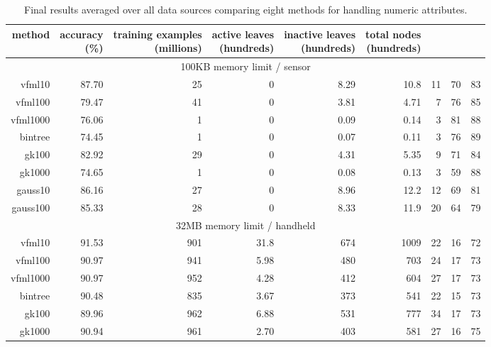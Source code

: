 \begin{table}
\caption{Final results averaged over all data sources comparing eight methods for handling numeric attributes.}
\label{tab:numavgs}
\centering
\begin{tabular}{|r|r|r|r|r|r|r|r|r|}
\hline
method	&
\rotatebox{90}{\parbox{9em}{accuracy\\(\%)}} &
\rotatebox{90}{\parbox{9em}{training examples\\(millions)}} &
\rotatebox{90}{\parbox{9em}{active leaves\\(hundreds)}} &
\rotatebox{90}{\parbox{9em}{inactive leaves\\(hundreds)}} &
\rotatebox{90}{\parbox{9em}{total nodes\\(hundreds)}} &
\rotatebox{90}{\parbox{9em}{tree depth}}	&
\rotatebox{90}{\parbox{9em}{training speed (\%)}} &
\rotatebox{90}{\parbox{9em}{prediction speed (\%)}} \\
\hline
\multicolumn{9}{|c|}{100KB memory limit / sensor} \\
\hline
{\sc vfml10} & 87.70 & 25 & 0 & 8.29 & 10.8 & 11 & 70 & 83 \\
{\sc vfml100} & 79.47 & 41 & 0 & 3.81 & 4.71 & 7 & 76 & 85 \\
{\sc vfml1000} & 76.06 & 1 & 0 & 0.09 & 0.14 & 3 & 81 & 88 \\
{\sc bintree} & 74.45 & 1 & 0 & 0.07 & 0.11 & 3 & 76 & 89 \\
{\sc gk100} & 82.92 & 29 & 0 & 4.31 & 5.35 & 9 & 71 & 84 \\
{\sc gk1000} & 74.65 & 1 & 0 & 0.08 & 0.13 & 3 & 59 & 88 \\
{\sc gauss10} & 86.16 & 27 & 0 & 8.96 & 12.2 & 12 & 69 & 81 \\
{\sc gauss100} & 85.33 & 28 & 0 & 8.33 & 11.9 & 20 & 64 & 79 \\
\hline
\multicolumn{9}{|c|}{32MB memory limit / handheld} \\
\hline
{\sc vfml10} & 91.53 & 901 & 31.8 & 674 & 1009 & 22 & 16 & 72 \\
{\sc vfml100} & 90.97 & 941 & 5.98 & 480 & 703 & 24 & 17 & 73 \\
{\sc vfml1000} & 90.97 & 952 & 4.28 & 412 & 604 & 27 & 17 & 73 \\
{\sc bintree} & 90.48 & 835 & 3.67 & 373 & 541 & 22 & 15 & 73 \\
{\sc gk100} & 89.96 & 962 & 6.88 & 531 & 777 & 34 & 17 & 73 \\
{\sc gk1000} & 90.94 & 961 & 2.70 & 403 & 581 & 27 & 16 & 75 \\

\end{tabular}
\end{table}
